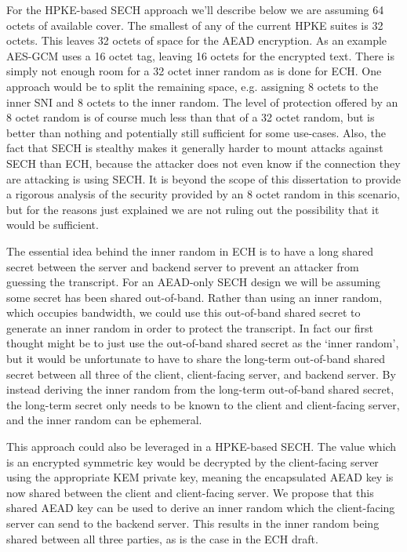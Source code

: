 For the \ac{HPKE}-based \ac{SECH} approach we'll describe below we are assuming
64 octets of available cover. The smallest  of any of the current
\ac{HPKE} suites is 32 octets. This leaves 32 octets of space for the \ac{AEAD}
encryption. As an example \ac{AES-GCM} uses a 16 octet tag, leaving 16 octets for the encrypted text.
There is simply not enough room for a 32 octet inner random as is done
for \ac{ECH}.
One approach would be to split the remaining space,
e.g. assigning 8 octets to the inner \ac{SNI} and 8 octets to the inner random.
The level of protection
offered by an 8 octet random is of course much less than that of a 32 octet random,
but is better than nothing and potentially still sufficient for some use-cases.
Also, the fact that \ac{SECH} is stealthy makes it generally harder to mount attacks
against \ac{SECH} than \ac{ECH},
because the attacker does not even know
if the connection they are attacking is using \ac{SECH}.
It is beyond the scope of this dissertation to provide a rigorous analysis
of the security provided by an 8 octet random in this scenario,
but for the reasons just explained we are not
ruling out the possibility that it would be sufficient.

The essential idea behind the inner random in \ac{ECH} is to have a long
shared secret between the server and backend server to prevent an attacker
from guessing the transcript.
For an \ac{AEAD}-only \ac{SECH} design we will be assuming some secret has
been shared out-of-band.
Rather than using an inner random, which occupies bandwidth,
we could use this out-of-band shared secret to generate an inner random
in order to protect the transcript.
In fact our first thought might be to just
use the out-of-band shared secret as the `inner random',
but it would be unfortunate to have to share the long-term out-of-band shared secret between
all three of the client, client-facing server, and backend server.
By instead deriving the inner random from the long-term out-of-band shared secret, the
long-term secret only needs to be known to the client and client-facing server, and 
the inner random can be ephemeral.

This approach could also be leveraged in a \ac{HPKE}-based \ac{SECH}.
The  value which is an encrypted symmetric key would be decrypted
by the client-facing server using the appropriate \ac{KEM} private key, meaning the encapsulated \ac{AEAD} key is
now shared between the client and client-facing server.
We propose that this shared \ac{AEAD} key can be used to derive an inner random
which the client-facing server can send to the backend server.
This results in the inner random being shared between all three parties, as is
the case in the \ac{ECH} draft.

